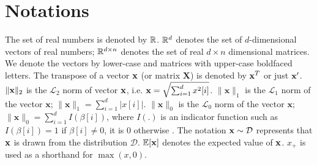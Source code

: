 \section{Notations}
\label{sec:notation}

The set of real numbers is denoted by $\mathbb{R}$. $\mathbb{R}^d$ denotes the set of
$d$-dimensional vectors of real numbers; $\mathbb{R}^{d\times n}$ denotes the
set of real $d\times n$ dimensional matrices. We denote the vectors by
lower-case and matrices with upper-case boldfaced letters. The
transpose of a vector $\mathbf{x}$ (or matrix $\mathbf{X}$) is denoted by
$\mathbf{x}^T$ or just $\mathbf{x}'$. $\|\mathbf{x}\|_2$ is the $\mathcal{L}_2$ norm of vector
$\mathbf{x}$, i.e. $\mathbf{x} = \sqrt{\sum_{i = 1}^{d} x^2[i]}$.  $\|\mathbf{x}\|_1$
is the $\mathcal{L}_1$ norm of the vector $\mathbf{x}$; \ie $\|\mathbf{x}\|_1 =
\sum_{i = 1}^{d}  | x[i] |$. $\|\mathbf{x}\|_0$
is the $\mathcal{L}_0$ norm of the vector $\mathbf{x}$; \ie $\|\mathbf{x}\|_0 =
\sum_{i = 1}^{d}   I(\beta[i]) $, where $I(.)$ is an indicator function such as $I(\beta[i]) = 1$ if $\beta[i] \neq 0$, it is 0 otherwise . The notation $\mathbf{x} \sim \mathcal{D}$ represents that $\mathbf{x}$ is drawn from the distribution $\mathcal{D}$. 
$\mathbb{E}[\mathbf{x}]$ denotes the expected value of $\mathbf{x}$. $x_+$ is used as a shorthand for $\max(x,0)$.

 

